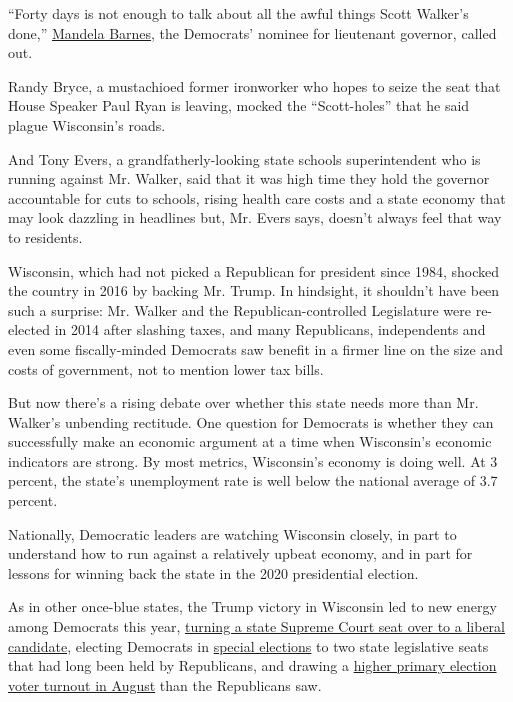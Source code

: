 ``Forty days is not enough to talk about all the awful things Scott
Walker's done,''
\href{https://www.jsonline.com/story/news/politics/elections/2018/08/15/media-reports-mandela-barnes-dead-white-and-not-ballot/982165002/}{Mandela
Barnes}, the Democrats' nominee for lieutenant governor, called out.

Randy Bryce, a mustachioed former ironworker who hopes to seize the seat
that House Speaker Paul Ryan is leaving, mocked the ``Scott-holes'' that
he said plague Wisconsin's roads.

And Tony Evers, a grandfatherly-looking state schools superintendent who
is running against Mr. Walker, said that it was high time they hold the
governor accountable for cuts to schools, rising health care costs and a
state economy that may look dazzling in headlines but, Mr. Evers says,
doesn't always feel that way to residents.

Wisconsin, which had not picked a Republican for president since 1984,
shocked the country in 2016 by backing Mr. Trump. In hindsight, it
shouldn't have been such a surprise: Mr. Walker and the
Republican-controlled Legislature were re-elected in 2014 after slashing
taxes, and many Republicans, independents and even some fiscally-minded
Democrats saw benefit in a firmer line on the size and costs of
government, not to mention lower tax bills.

But now there's a rising debate over whether this state needs more than
Mr. Walker's unbending rectitude. One question for Democrats is whether
they can successfully make an economic argument at a time when
Wisconsin's economic indicators are strong. By most metrics, Wisconsin's
economy is doing well. At 3 percent, the state's unemployment rate is
well below the national average of 3.7 percent.

Nationally, Democratic leaders are watching Wisconsin closely, in part
to understand how to run against a relatively upbeat economy, and in
part for lessons for winning back the state in the 2020 presidential
election.

As in other once-blue states, the Trump victory in Wisconsin led to new
energy among Democrats this year,
\href{https://www.nytimes.com/2018/04/03/us/wisconsin-election-supreme-court.html}{turning
a state Supreme Court seat over to a liberal candidate}, electing
Democrats in
\href{https://www.nytimes.com/2018/01/17/us/wisconsin-elections-state-senate.html}{special
elections} to two state legislative seats that had long been held by
Republicans, and drawing a
\href{https://www.jsonline.com/story/news/blogs/wisconsin-voter/2018/08/15/democrats-outdraw-republicans-wisconsin-primary-turnout-nears-1-million/996379002/}{higher
primary election voter turnout in August} than the Republicans saw.

